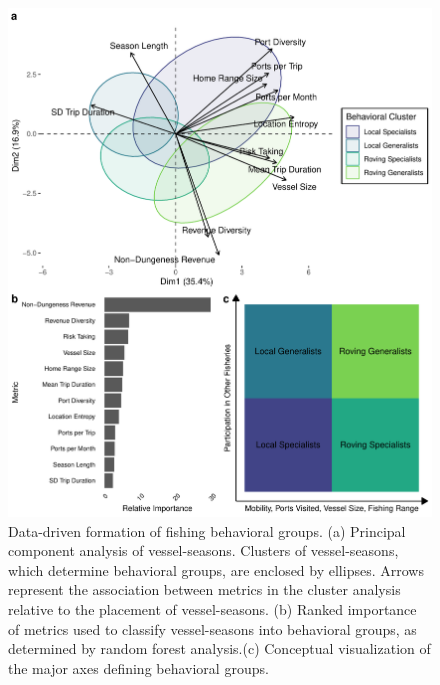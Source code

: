 \documentclass[]{elsarticle} %
\begin{document}
\begin{figure}%
\includegraphics [width=\linewidth]{fig_pca_rf.pdf}
\caption{Data-driven formation of fishing behavioral groups. (a) Principal component analysis of vessel-seasons. Clusters of vessel-seasons, which determine behavioral groups, are enclosed by ellipses. Arrows represent the association between metrics in the cluster analysis relative to the placement of vessel-seasons. (b) Ranked importance of metrics used to classify vessel-seasons into behavioral groups, as determined by random forest analysis.(c) Conceptual visualization of the major axes defining behavioral groups.}
\label{fig:pca}
\end{figure}
\end{document}
